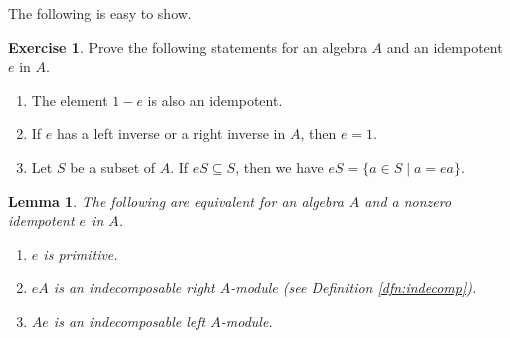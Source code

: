 \documentclass{surv-l}
\numberwithin{equation}{chapter}
\numberwithin{figure}{chapter}
\theoremstyle{plain}
\newtheorem{lem}[thm]{Lemma}
\theoremstyle{definition}
\newtheorem{exc}[thm]{Exercise}
\theoremstyle{remark}
\begin{document}
The following is easy to show.

\begin{exc}\label{exc:idemp}
Prove the following statements for an algebra $A$ and an idempotent $e$ in $A$.
\begin{enumerate}
\item
The element $1-e$ is also an idempotent.
\item
If $e$ has a left inverse or a right inverse in $A$,
then $e =1$.
\item
Let $S$ be a subset of $A$.
If $eS \subseteq S$, then we have
$eS = \{a \in S \mid a = ea\}$.
\end{enumerate}
\end{exc}

\begin{lem}\label{lem:primitive-indec}\label{lem:2.3.3}
The following are equivalent for an algebra $A$ and
a nonzero idempotent $e$ in $A$.
\begin{enumerate}
\item
$e$ is primitive.
\item
$eA$ is an indecomposable right $A$-module {\rm (see Definition \ref{dfn:indecomp})}.
\item
$Ae$ is an indecomposable left $A$-module.
\end{enumerate}
\end{lem}
\end{document}
